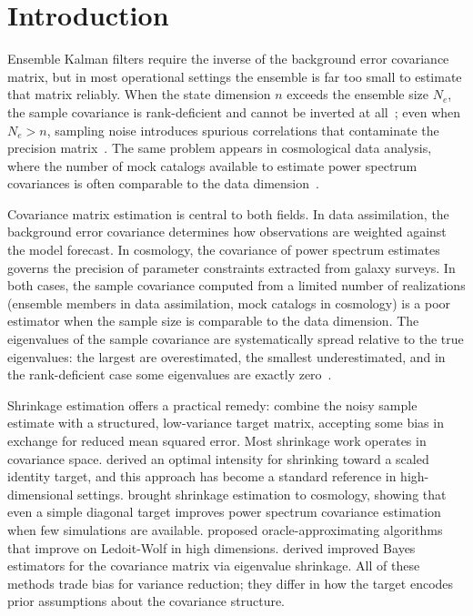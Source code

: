 \chapter{Introduction}
\label{ch:introduction}

Ensemble Kalman filters require the inverse of the background error covariance matrix, but in most operational settings the ensemble is far too small to estimate that matrix reliably. When the state dimension $n$ exceeds the ensemble size $N_e$, the sample covariance is rank-deficient and cannot be inverted at all~\citep{houtekamer1998data}; even when $N_e > n$, sampling noise introduces spurious correlations that contaminate the precision matrix~\citep{anderson2001ensemble}. The same problem appears in cosmological data analysis, where the number of mock catalogs available to estimate power spectrum covariances is often comparable to the data dimension~\citep{hamilton2006measuring}.

Covariance matrix estimation is central to both fields. In data assimilation, the background error covariance determines how observations are weighted against the model forecast. In cosmology, the covariance of power spectrum estimates governs the precision of parameter constraints extracted from galaxy surveys. In both cases, the sample covariance computed from a limited number of realizations (ensemble members in data assimilation, mock catalogs in cosmology) is a poor estimator when the sample size is comparable to the data dimension. The eigenvalues of the sample covariance are systematically spread relative to the true eigenvalues: the largest are overestimated, the smallest underestimated, and in the rank-deficient case some eigenvalues are exactly zero~\citep{ledoit2004well}.

Shrinkage estimation offers a practical remedy: combine the noisy sample estimate with a structured, low-variance target matrix, accepting some bias in exchange for reduced mean squared error. Most shrinkage work operates in covariance space. \citep{ledoit2004well} derived an optimal intensity for shrinking toward a scaled identity target, and this approach has become a standard reference in high-dimensional settings. \citep{pope2008shrinkage} brought shrinkage estimation to cosmology, showing that even a simple diagonal target improves power spectrum covariance estimation when few simulations are available. \citep{chen2010shrinkage} proposed oracle-approximating algorithms that improve on Ledoit-Wolf in high dimensions. \citep{haff1991variational} derived improved Bayes estimators for the covariance matrix via eigenvalue shrinkage. All of these methods trade bias for variance reduction; they differ in how the target encodes prior assumptions about the covariance structure.

